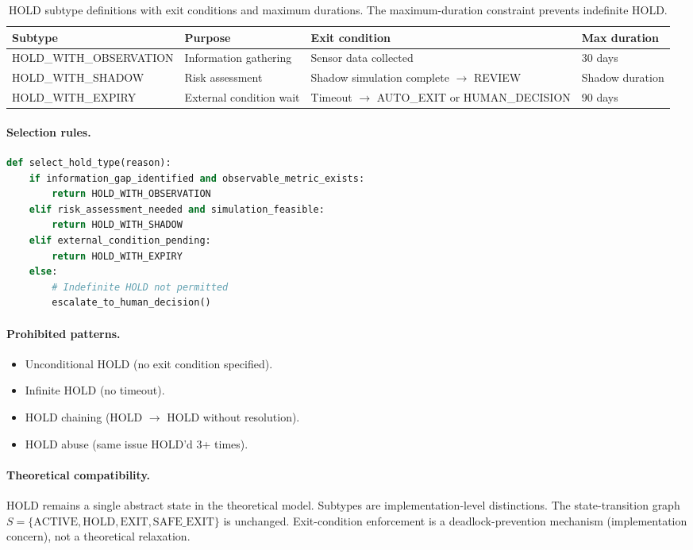 \clearpage
\begin{table}[ht]
\centering
\small
\begin{tabularx}{\linewidth}{lXXl}
\toprule
\textbf{Subtype} & \textbf{Purpose} & \textbf{Exit condition} & \textbf{Max duration} \\
\midrule
HOLD\_WITH\_OBSERVATION
& Information gathering
& Sensor data collected
& 30 days \\
HOLD\_WITH\_SHADOW
& Risk assessment
& Shadow simulation complete $\to$ REVIEW
& Shadow duration \\
HOLD\_WITH\_EXPIRY
& External condition wait
& Timeout $\to$ AUTO\_EXIT or HUMAN\_DECISION
& 90 days \\
\bottomrule
\end{tabularx}
\caption[HOLD subtypes]{HOLD subtype definitions with exit conditions
and maximum durations. The maximum-duration constraint prevents
indefinite HOLD.}
\label{tab:hold-subtypes}
\end{table}

\paragraph{Selection rules.}

\begin{lstlisting}[language=Python,basicstyle=\ttfamily\small,frame=single]
def select_hold_type(reason):
    if information_gap_identified and observable_metric_exists:
        return HOLD_WITH_OBSERVATION
    elif risk_assessment_needed and simulation_feasible:
        return HOLD_WITH_SHADOW
    elif external_condition_pending:
        return HOLD_WITH_EXPIRY
    else:
        # Indefinite HOLD not permitted
        escalate_to_human_decision()
\end{lstlisting}

\paragraph{Prohibited patterns.}
\begin{itemize}
\item Unconditional HOLD (no exit condition specified).
\item Infinite HOLD (no timeout).
\item HOLD chaining (HOLD $\to$ HOLD without resolution).
\item HOLD abuse (same issue HOLD'd 3+ times).
\end{itemize}

\paragraph{Theoretical compatibility.}
HOLD remains a single abstract state in the theoretical model.
Subtypes are implementation-level distinctions. The state-transition
graph $S = \{\mathrm{ACTIVE}, \mathrm{HOLD}, \mathrm{EXIT},
\mathrm{SAFE\_EXIT}\}$ is unchanged. Exit-condition enforcement is a
deadlock-prevention mechanism (implementation concern), not a
theoretical relaxation.

